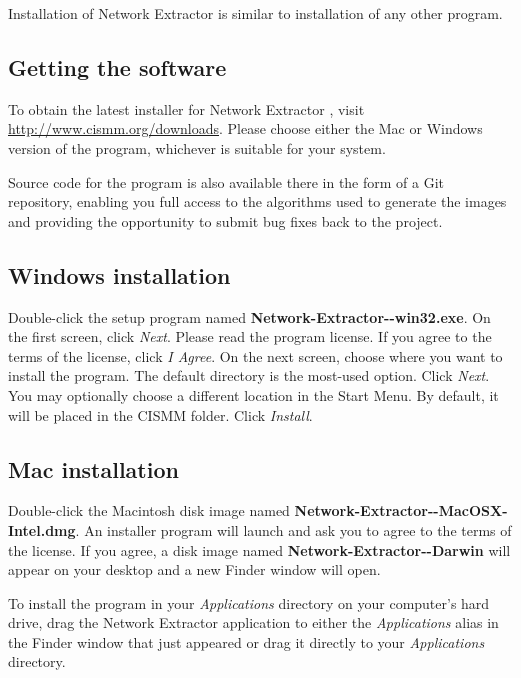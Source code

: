 \documentclass[11pt,titlepage,twoside]{article}
\begin{document}
Installation of Network Extractor \ProgramVersion is similar to installation of any other program.

\subsection{Getting the software}

To obtain the latest installer for Network Extractor \ProgramVersionNoSpace, visit \url{http://www.cismm.org/downloads}. Please choose either the Mac or Windows version of the program, whichever is suitable for your system.

Source code for the program is also available there in the form of a Git repository, enabling you full access to the algorithms used to generate the images and providing the opportunity to submit bug fixes back to the project. 

\subsection{Windows installation}

Double-click the setup program named \textbf{Network-Extractor-\ProgramVersionNoSpace-win32.exe}. On the first screen, click \emph{Next}. Please read the program license. If you agree to the terms of the license, click \emph{I Agree}. On the next screen, choose where you want to install the program. The default directory is the most-used option. Click \emph{Next}. You may optionally choose a different location in the Start Menu. By default, it will be placed in the CISMM folder. Click \emph{Install}.

\subsection{Mac installation}

Double-click the Macintosh disk image named \textbf{Network-Extractor-\ProgramVersionNoSpace-MacOSX-Intel.dmg}. An installer program will launch and ask you to agree to the terms of the license. If you agree, a disk image named \textbf{Network-Extractor-\ProgramVersionNoSpace-Darwin} will appear on your desktop and a new Finder window will open.

To install the program in your \emph{Applications} directory on your computer's hard drive, drag the Network Extractor \ProgramVersion application to either the \emph{Applications} alias in the Finder window that just appeared or drag it directly to your \emph{Applications} directory.
\end{document}
